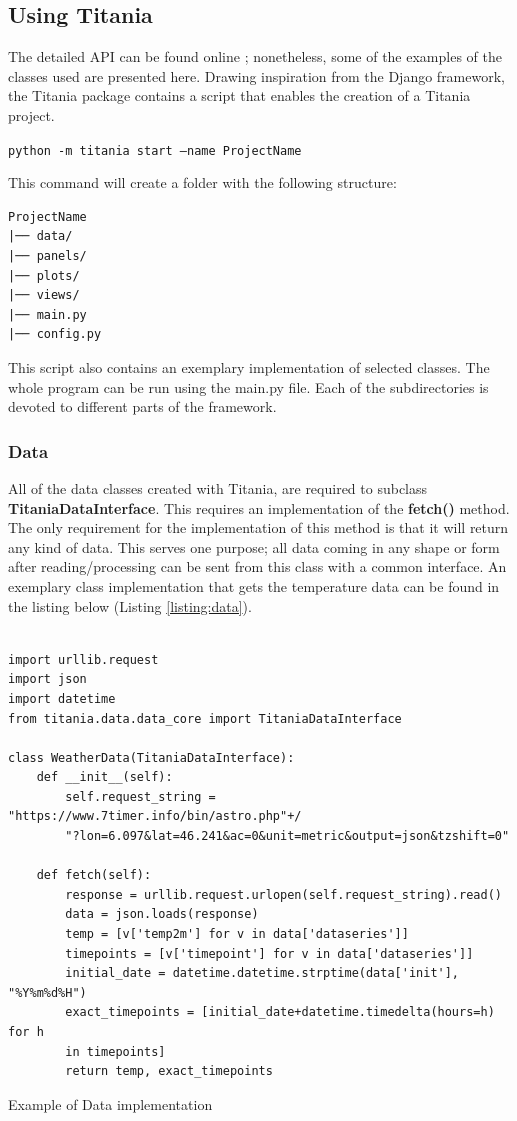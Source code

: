 \subsection{Using Titania}

The detailed API can be found online \cite{titaniadoc}; nonetheless, some of the examples of the classes used are presented here.
Drawing inspiration from the Django framework, the Titania package contains a script that enables the creation of a Titania project.

\texttt{python -m titania start --name ProjectName}

This command will create a folder with the following structure:

\begin{listing}[!ht]
\begin{verbatim}
ProjectName
|── data/
|── panels/
|── plots/
|── views/
|── main.py
|── config.py
\end{verbatim}
\end{listing}

This script also contains an exemplary implementation of selected classes.
The whole program can be run using the main.py file.
Each of the subdirectories is devoted to different parts of the framework.


\subsubsection{Data}
\label{sec:titania_data}

All of the data classes created with Titania, are required to subclass \textbf{TitaniaDataInterface}. This requires an implementation of the \textbf{fetch()} method.
The only requirement for the implementation of this method is that it will return any kind of data.
This serves one purpose; all data coming in any shape or form after reading/processing can be sent from this class with a common interface. An exemplary class implementation that gets the temperature data can be found in the listing below (Listing \ref{listing:data}).

\begin{listing}[!ht]
\begin{verbatim}

import urllib.request
import json
import datetime
from titania.data.data_core import TitaniaDataInterface

class WeatherData(TitaniaDataInterface):
    def __init__(self):
        self.request_string = "https://www.7timer.info/bin/astro.php"+/
        "?lon=6.097&lat=46.241&ac=0&unit=metric&output=json&tzshift=0"

    def fetch(self):
        response = urllib.request.urlopen(self.request_string).read()
        data = json.loads(response)
        temp = [v['temp2m'] for v in data['dataseries']]
        timepoints = [v['timepoint'] for v in data['dataseries']]
        initial_date = datetime.datetime.strptime(data['init'], "%Y%m%d%H")
        exact_timepoints = [initial_date+datetime.timedelta(hours=h) for h
        in timepoints]
        return temp, exact_timepoints
\end{verbatim}
\caption{Example of Data implementation}
\label{listing:data}
\end{listing}

